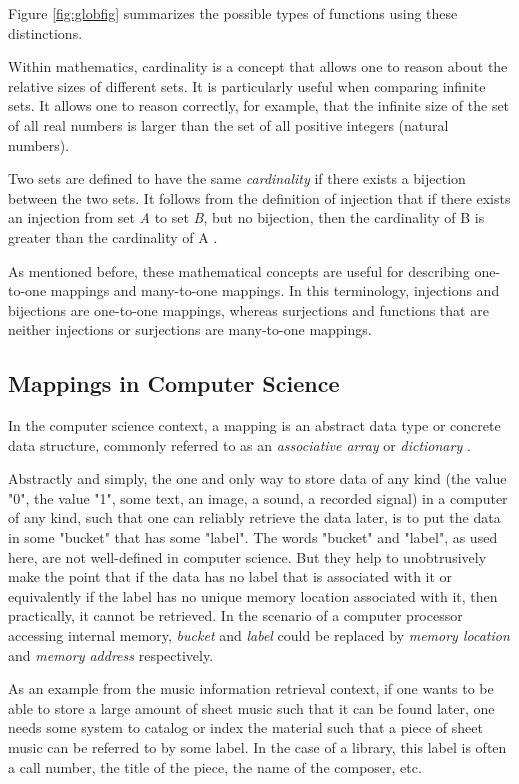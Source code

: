 Figure \ref{fig:globfig} summarizes the possible types of functions using these distinctions.

Within mathematics, cardinality is a concept that allows one to reason about the relative sizes of different sets. It is particularly useful when comparing infinite sets. It allows one to reason correctly, for example, that the infinite size of the set of all real numbers is larger than the set of all positive integers (natural numbers).

Two sets are defined to have the same \emph{cardinality} if there exists a bijection between the two sets. It follows from the definition of injection that if there exists an injection from set \emph{A} to set \emph{B}, but no bijection, then the cardinality of B is greater than the cardinality of A \cite{cardmath2010}.

As mentioned before, these mathematical concepts are useful for describing one-to-one mappings and many-to-one mappings. In this terminology, injections and bijections are one-to-one mappings, whereas surjections and functions that are neither injections or surjections are many-to-one mappings.

\subsection{Mappings in Computer Science}
\label{sec:Mappings in Computer Science}

In the computer science context, a mapping is an abstract data type or concrete data structure, commonly referred to as an \emph{associative array} or \emph{dictionary} \cite{assocarray2008}.  

Abstractly and simply, the one and only way to store data of any kind (the value "0", the value "1", some text, an image, a sound, a recorded signal) in a computer of any kind, such that one can reliably retrieve the data later, is to put the data in some "bucket" that has some "label". The words "bucket" and "label", as used here, are not well-defined in computer science. But they help to unobtrusively make the point that if the data has no label that is associated with it or equivalently if the label has no unique memory location associated with it, then practically, it cannot be retrieved. In the scenario of a computer processor accessing internal memory, \emph{bucket} and \emph{label} could be replaced by \emph{memory location} and \emph{memory address} respectively.

As an example from the music information retrieval context, if one wants to be able to store a large amount of sheet music such that it can be found later, one needs some system to catalog or index the material such that a piece of sheet music can be referred to by some label. In the case of a library, this label is often a call number, the title of the piece, the name of the composer, etc.

